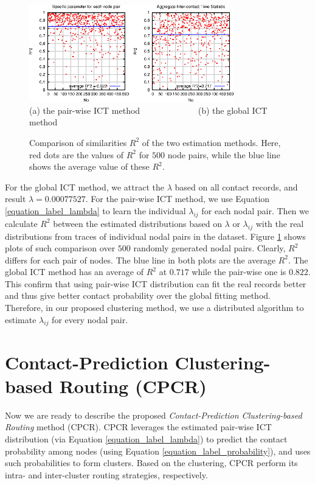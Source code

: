 \documentclass[conference]{IEEEtran}
\begin{document}
\begin{figure}[!h]
\centering
  \includegraphics[width=3.5in]{figures_1/R2_comprision.eps}\\
  (a) the pair-wise ICT method \ \ \ \ \ \ \ \ \ \ \ \ \ (b) the global ICT method
  \caption{Comparison of similarities $R^2$ of the two estimation methods. Here, red dots are the values of $R^2$ for $500$ node pairs, while the blue line shows the average value of these $R^2$.}\label{figure_label_Comparison_between_R2}
\end{figure}

For the global ICT method,  we attract the $\lambda$ based on all contact records, and result $\lambda= 0.00077527$. For the pair-wise ICT method, we use Equation  \ref{equation_label_lambda} to learn the individual $\lambda_{ij}$ for each nodal pair. Then we calculate  $R^{2}$  between the estimated distributions based on $\lambda$ or $\lambda_{ij}$ with the real distributions from traces of individual nodal pairs in the dataset. Figure \ref{figure_label_Comparison_between_R2} shows plots of such comparison over  $500$ randomly generated nodal pairs. Clearly, $R^{2}$ differs for each pair of nodes. The blue line in both plots are the average $R^{2}$. The global ICT method has an average of $R^{2}$ at $0.717$ while the pair-wise one is $0.822$. This confirm that using pair-wise ICT distribution can fit the real records better and thus give better contact probability over the global fitting method. Therefore, in our proposed clustering method, we use a distributed algorithm to estimate $\lambda_{ij}$ for every nodal pair.

\section{Contact-Prediction Clustering-based Routing (CPCR)}
\label{Section4_algorithm}

Now we are ready to describe the proposed \emph{Contact-Prediction Clustering-based Routing} method (CPCR).
CPCR leverages the estimated pair-wise ICT distribution (via Equation \ref{equation_label_lambda}) to predict the contact probability among nodes (using Equation \ref{equation_label_probability}), and uses such probabilities to form clusters. Based on the clustering,
CPCR perform its intra- and inter-cluster routing strategies, respectively.
\end{document}
